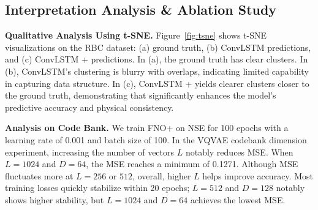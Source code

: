 \begin{table}[t]
 \small
  \centering
  \begin{sc}
    \caption{Ablation studies on the NSE benchmark.}  
    \label{tab:ablation}
  \end{sc}
\end{table}


\subsection{Interpretation Analysis \& Ablation Study}

\textbf{Qualitative Analysis Using t-SNE.} Figure~\ref{fig:tsne} shows t-SNE visualizations on the RBC dataset: (a) ground truth, (b) ConvLSTM predictions, and (c) ConvLSTM + \method{} predictions. In (a), the ground truth has clear clusters. In (b), ConvLSTM’s clustering is blurry with overlaps, indicating limited capability in capturing data structure. In (c), ConvLSTM + \method{} yields clearer clusters closer to the ground truth, demonstrating that \method{} significantly enhances the model’s predictive accuracy and physical consistency.

\textbf{Analysis on Code Bank.} We train FNO+\method{} on NSE for 100 epochs with a learning rate of 0.001 and batch size of 100. In the VQVAE codebank dimension experiment, increasing the number of vectors $L$ notably reduces MSE. When $L=1024$ and $D=64$, the MSE reaches a minimum of 0.1271. Although MSE fluctuates more at $L=256$ or $512$, overall, higher $L$ helps improve accuracy. Most training losses quickly stabilize within 20 epochs; $L=512$ and $D=128$ notably shows higher stability, but $L=1024$ and $D=64$ achieves the lowest MSE.

